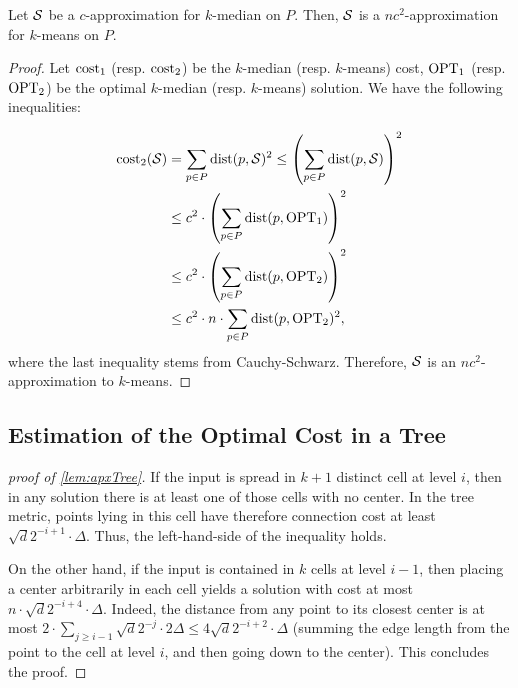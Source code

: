 \begin{lemma}\label{lem:kmedTokmeans}
Let $\mathcal S$ be a $c$-approximation for $k$-median on $P$. Then, $\mathcal S$ is a $nc^2$-approximation for $k$-means on $P$.
\end{lemma}

\begin{proof}

Let $\operatorname{cost}_1$ (resp. $\operatorname{cost}_2$) be the $k$-median (resp. $k$-means) cost, $\text{OPT}_1$ (resp. $\text{OPT}_2$) be the optimal $k$-median (resp. $k$-means) solution. We
have the following inequalities:

\begin{align*}
\operatorname{cost}_2(\mathcal S) &= \sum_{p\in P} \operatorname{dist}(p, \mathcal S)^2 \leq \left( \sum_{p\in P} \operatorname{dist}(p, \mathcal S)\right)^2\\
&\leq c^2 \cdot \left(  \sum_{p\in P} \operatorname{dist}(p, \text{OPT}_1)\right)^2\\
&\leq c^2 \cdot \left(  \sum_{p\in P} \operatorname{dist}(p, \text{OPT}_2)\right)^2\\
&\leq c^2 \cdot n \cdot  \sum_{p\in P} \operatorname{dist}(p, \text{OPT}_2)^2,
\end{align*}
where the last inequality stems from Cauchy-Schwarz. Therefore, $\mathcal S$ is an $nc^2$-approximation to $k$-means. 
\end{proof}

\subsection{Estimation of the Optimal Cost in a Tree}
\label{app:apx-tree-proof}

\begin{proof}[proof of \cref{lem:apxTree}]

If the input is spread in $k+1$ distinct cell at level $i$, then in any solution there is at least one of those cells with no center. In the tree metric, points
lying in this cell have therefore connection cost at least $\sqrt{d}2^{-i+1} \cdot \Delta$. Thus, the left-hand-side of the inequality holds.

On the other hand, if the input is contained in $k$ cells at level $i-1$, then placing a center arbitrarily in each cell yields a solution with cost at most
$n \cdot \sqrt{d}2^{-i+4} \cdot \Delta$. Indeed, the distance from any point to its closest center is at most $2 \cdot \sum_{j \geq i-1} \sqrt{d}2^{-j} \cdot
2\Delta \leq 4 \sqrt{d}2^{-i+2} \cdot \Delta$ (summing the edge length from the point to the cell at level $i$, and then going down to the center). This
concludes the proof.

\end{proof}


